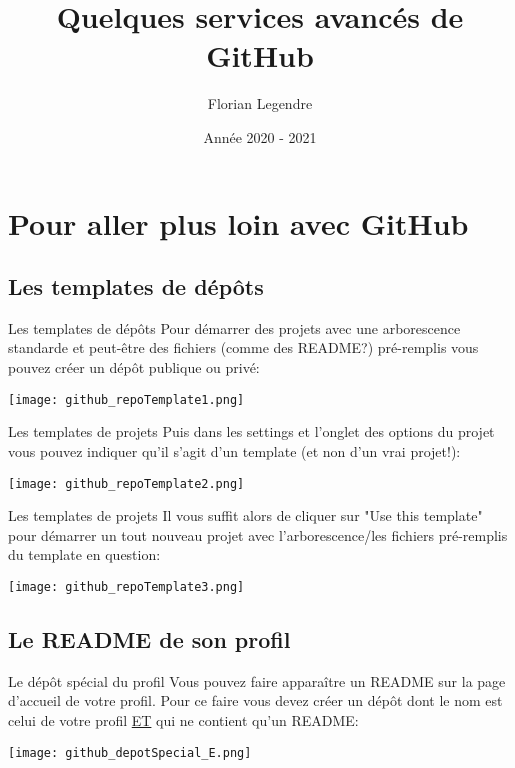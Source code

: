 \documentclass{beamer}
\title[Github]{Quelques services avancés de GitHub}
\author{Florian Legendre}
\institute{Université de Poitiers}
\date{Année 2020 - 2021}
\begin{document}
\frame{\titlepage}




\section{Pour aller plus loin avec GitHub}


\subsection{Les templates de dépôts}
\begin{frame}{Les templates de dépôts}
Pour démarrer des projets avec une arborescence standarde et peut-être des fichiers (comme des README?) pré-remplis vous pouvez créer un dépôt publique ou privé:
\begin{center}
	\texttt{[image: github\_repoTemplate1.png]}
\end{center}
\end{frame}

\begin{frame}{Les templates de projets}
Puis dans les settings et l'onglet des options du projet vous pouvez indiquer qu'il s'agit d'un template (et non d'un vrai projet!):
\begin{center}
	\texttt{[image: github\_repoTemplate2.png]}
\end{center}
\end{frame}

\begin{frame}{Les templates de projets}
Il vous suffit alors de cliquer sur "Use this template" pour démarrer un tout nouveau projet avec l'arborescence/les fichiers pré-remplis du template en question:
\begin{center}
	\texttt{[image: github\_repoTemplate3.png]}
\end{center}
\end{frame}


\subsection{Le README de son profil}
\begin{frame}{Le dépôt spécial du profil}
Vous pouvez faire apparaître un README sur la page d'accueil de votre profil. Pour ce faire vous devez créer un dépôt dont le nom est celui de votre profil \underline{ET} qui ne contient qu'un README:
\begin{center}
	\texttt{[image: github\_depotSpecial\_E.png]}
\end{center}
\end{frame}
\end{document}
